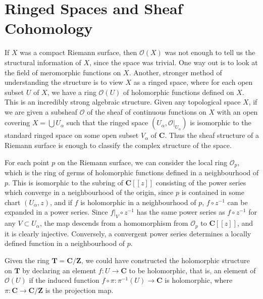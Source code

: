 \section{Ringed Spaces and Sheaf Cohomology}

If $X$ was a compact Riemann surface, then $\mathcal{O}(X)$ was not enough to tell us the structural information of $X$, since the space was trivial. One way out is to look at the field of meromorphic functions on $X$. Another, stronger method of understanding the structure is to view $X$ as a ringed space, where for each open subset $U$ of $X$, we have a ring $\mathcal{O}(U)$ of holomorphic functions defined on $X$. This is an incredibly strong algebraic structure. Given any topological space $X$, if we are given a subsheaf $\mathcal{O}$ of the sheaf of continuous functions on $X$ with an open covering $X = \bigcup U_\alpha$ such that the ringed space $(U_\alpha, \mathcal{O}|_{U_\alpha})$ is isomorphic to the standard ringed space on some open subset $V_\alpha$ of $\mathbf{C}$. Thus the sheaf structure of a Riemann surface is enough to classify the complex structure of the space.

For each point $p$ on the Riemann surface, we can consider the local ring $\mathcal{O}_p$, which is the ring of germs of holomorphic functions defined in a neighbourhood of $p$. This is isomorphic to the subring of $\mathbf{C}[[z]]$ consisting of the power series which converge in a neighbourhood of the origin, since $p$ is contained in some chart $(U_\alpha, z)$, and if $f$ is holomorphic in a neighbourhood of $p$, $f \circ z^{-1}$ can be expanded in a power series. Since $f|_V \circ z^{-1}$ has the same power series as $f \circ z^{-1}$ for any $V \subset U_\alpha$, the map descends from a homomorphism from $\mathcal{O}_p$ to $\mathbf{C}[[z]]$, and it is clearly injective. Conversely, a convergent power series determines a locally defined function in a neighbourhood of $p$.

\begin{example}
    Given the ring $\mathbf{T} = \mathbf{C}/\mathbf{Z}$, we could have constructed the holomorphic structure on $\mathbf{T}$ by declaring an element $f: U \to \mathbf{C}$ to be holomorphic, that is, an element of $\mathcal{O}(U)$ if the induced function $f \circ \pi: \pi^{-1}(U) \to \mathbf{C}$ is holomorphic, where $\pi: \mathbf{C} \to \mathbf{C} / \mathbf{Z}$ is the projection map.
\end{example}

